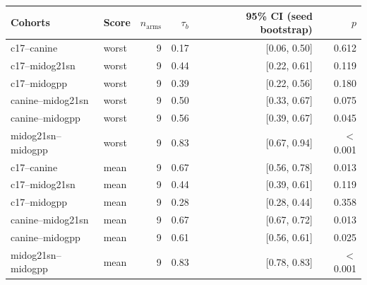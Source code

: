 \begin{tabular}{llrrrr}
\toprule
Cohorts & Score & $n_\text{arms}$ & $\tau_b$ & 95\% CI (seed bootstrap) & $p$ \\
\midrule
c17--canine & worst & 9 & 0.17 & [0.06, 0.50] & 0.612 \\
c17--midog21sn & worst & 9 & 0.44 & [0.22, 0.61] & 0.119 \\
c17--midogpp & worst & 9 & 0.39 & [0.22, 0.56] & 0.180 \\
canine--midog21sn & worst & 9 & 0.50 & [0.33, 0.67] & 0.075 \\
canine--midogpp & worst & 9 & 0.56 & [0.39, 0.67] & 0.045 \\
midog21sn--midogpp & worst & 9 & 0.83 & [0.67, 0.94] & $<$0.001 \\
c17--canine & mean & 9 & 0.67 & [0.56, 0.78] & 0.013 \\
c17--midog21sn & mean & 9 & 0.44 & [0.39, 0.61] & 0.119 \\
c17--midogpp & mean & 9 & 0.28 & [0.28, 0.44] & 0.358 \\
canine--midog21sn & mean & 9 & 0.67 & [0.67, 0.72] & 0.013 \\
canine--midogpp & mean & 9 & 0.61 & [0.56, 0.61] & 0.025 \\
midog21sn--midogpp & mean & 9 & 0.83 & [0.78, 0.83] & $<$0.001 \\
\bottomrule
\end{tabular}

